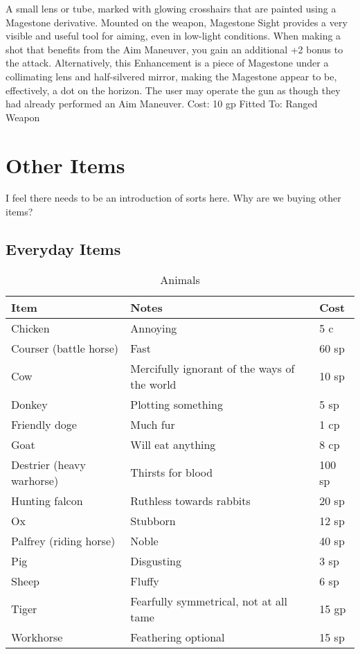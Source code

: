 \documentclass[oneside,11pt,english]{book}
\begin{document}
A small lens or tube, marked with glowing crosshairs that are painted using a Magestone derivative. 
Mounted on the weapon, Magestone Sight provides a very visible and useful tool for aiming, even in low-light conditions. When making a shot that benefits from the Aim Maneuver, you gain an additional +2 bonus to the attack. Alternatively, this Enhancement is a piece of Magestone under a collimating lens and half-silvered mirror, making the Magestone appear to be, effectively, a dot on the horizon. The user may operate the gun as though they had already performed an Aim Maneuver. 
Cost: 10 gp
Fitted To: Ranged Weapon 
 
\chapter{Other Items}\label{ch:Other Items} %
\startcontents[chapters]
\clearpage

I feel there needs to be an introduction of sorts here. Why are we buying other items?

\section{Everyday Items}
\begin{table}[hb]
	\centering
	\caption{Animals}
	\label{tab:Animals}
	\begin{tabu} spread 0pt {*{3}{X[-1]}}
		Item& Notes &Cost\\\toprule
Chicken &Annoying &5 c\\
Courser (battle horse) &Fast &60 sp\\
Cow &Mercifully ignorant of the ways of the world &10 sp\\
Donkey &Plotting something &5 sp\\
Friendly doge &Much fur &1 cp\\
Goat &Will eat anything &8 cp\\
Destrier (heavy warhorse) &Thirsts for blood &100 sp\\
Hunting falcon &Ruthless towards rabbits &20 sp\\
Ox &Stubborn &12 sp\\
Palfrey (riding horse) &Noble &40 sp\\
Pig &Disgusting &3 sp\\
Sheep &Fluffy &6 sp\\
Tiger &Fearfully symmetrical, not at all tame &15 gp\\
Workhorse &Feathering optional &15 sp\\
	\end{tabu}
\end{table}
\end{document}
